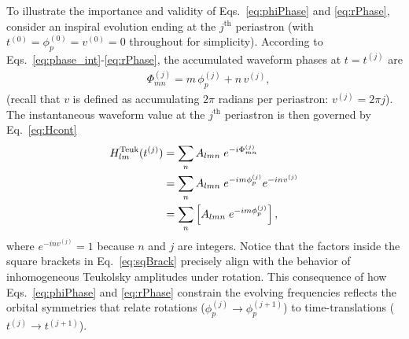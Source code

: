 \documentclass[aps,prd,twocolumn,showpacs,notitlepage,eqsecnum,
superscriptaddress,nofootinbib]{revtex4-1}
\begin{document}
To illustrate the importance and validity of Eqs.~\eqref{eq:phiPhase} and \eqref{eq:rPhase}, consider an inspiral evolution ending at the $j^\text{th}$ periastron (with $t^{(0)} = \phi^{(0)}_p = v^{(0)} = 0$ throughout for simplicity). According to Eqs.~\eqref{eq:phase_int}-\eqref{eq:rPhase}, the accumulated waveform phases at $t=t^{(j)}$ are
\begin{align}
\label{eq:periPhase}
&\Phi_{mn}^{(j)} = m\, \phi^{(j)}_p + n\, v^{(j)} ,
\end{align}
(recall that $v$ is defined as accumulating $2\pi$ radians per periastron: $v^{(j)} = 2\pi j$). The instantaneous waveform value at the $j^\text{th}$ periastron is then governed by Eq.~\eqref{eq:Hcont}
\begin{align}
H^\text{Teuk}_{lm}(t^{(j)}) &= \sum_n A_{lmn} \; e^{-i \Phi^{(j)}_{mn}} \notag
\\ &= \sum_n A_{lmn} \; e^{-i m \phi^{(j)}_p} e^{-i n v^{(j)}} \notag
\\ &= \sum_n \left[ A_{lmn} \; e^{-i m \phi^{(j)}_p}\right] ,
\label{eq:sqBrack}
\end{align}
where $e^{-i n v^{(j)}}=1$ because $n$ and $j$ are integers. Notice that the factors inside the square brackets in Eq.~\eqref{eq:sqBrack} precisely align with the behavior of inhomogeneous Teukolsky amplitudes under rotation. This consequence of how Eqs.~\eqref{eq:phiPhase} and \eqref{eq:rPhase} constrain the evolving frequencies reflects the orbital symmetries that relate rotations ($\phi_p^{(j)}\rightarrow \phi_p^{(j+1)}$) to time-translations ($t^{(j)}\rightarrow t^{(j+1)}$).
\end{document}
